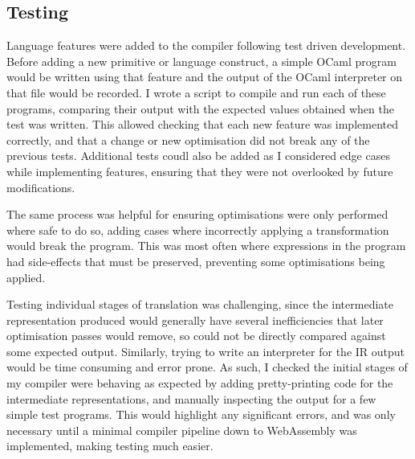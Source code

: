 \subsection{Testing}
Language features were added to the compiler following test driven development. Before adding a new primitive or language construct, a simple OCaml program would be written using that feature and the output of the OCaml interpreter on that file would be recorded. 
I wrote a script to compile and run each of these programs, comparing their output with the expected values obtained when the test was written. This allowed checking that each new feature was implemented correctly, and that a change or new optimisation did not break any of the previous tests. Additional tests coudl also be added as I considered edge cases while implementing features, ensuring that they were not overlooked by future modifications.

 The same process was helpful for ensuring optimisations were only performed where safe to do so, adding cases where incorrectly applying a transformation would break the program. This was most often where expressions in the program had side-effects that must be preserved, preventing some optimisations being applied.



Testing individual stages of translation was challenging, since the intermediate representation produced would generally have several inefficiencies that later optimisation passes would remove, so could not be directly compared against some expected output. Similarly, trying to write an interpreter for the IR output would be time consuming and error prone. As such, I checked the initial stages of my compiler were behaving as expected by adding pretty-printing code for the intermediate representations, and manually inspecting the output for a few simple test programs. This would highlight any significant errors, and was only necessary until a minimal compiler pipeline down to WebAssembly was implemented, making testing much easier.

